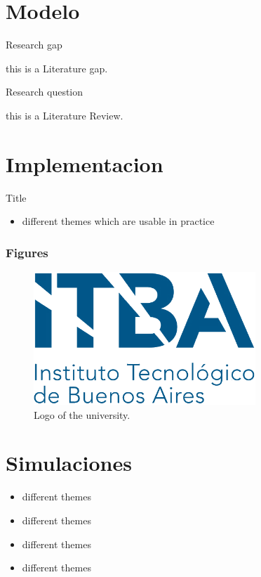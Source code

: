 \section{Modelo}
\begin{frame}{Research gap}

   this is a Literature gap.

\end{frame}

\begin{frame}{Research question}

   this is a Literature Review.

\end{frame}

\section{Implementacion}
\begin{frame}{Title}
    \begin{itemize}
        \item different themes which are usable in practice
    \end{itemize}
\end{frame}

\begin{frame}
	\frametitle<presentation>{Figures}
	\begin{figure}
		\centering
			\includegraphics[height=5cm]{pic/itba.png}
		\caption{Logo of the university.}
		\label{fig:unilogo}
	\end{figure}
\end{frame}


\section{Simulaciones}
\begin{frame}
    \begin{itemize}
        \item different themes
        \item different themes
        \item different themes
        \item different themes
    \end{itemize}
\end{frame}

